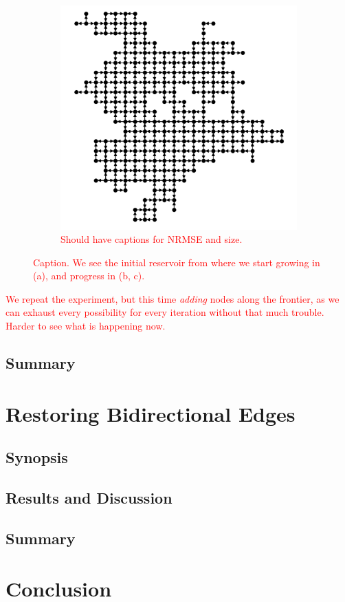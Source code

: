 \begin{figure}[t]
\begin{subfigure}{.49\textwidth}
    \includegraphics[width=1.0\linewidth]{figures/sq-grid-grow-250.png}
    \caption{\textcolor{red}{Should have captions for NRMSE and size.}}
    \label{fig:sq-grid-grow-250}
  \end{subfigure}
  \caption{
    \textcolor{red}{
      Caption. We see the initial reservoir from where we start growing in (a),
and progress in (b, c).
    }
  }
  \label{fig:sq-grid-grow}
\end{figure}

\textcolor{red}{
  We repeat the experiment, but this time \textit{adding} nodes along the
frontier, as we can exhaust every possibility for every iteration without that
much trouble. Harder to see what is happening now.
}

\subsection{Summary}

\section{Restoring Bidirectional Edges}

\subsection{Synopsis}

\subsection{Results and Discussion}



\subsection{Summary}

\section{Conclusion}


